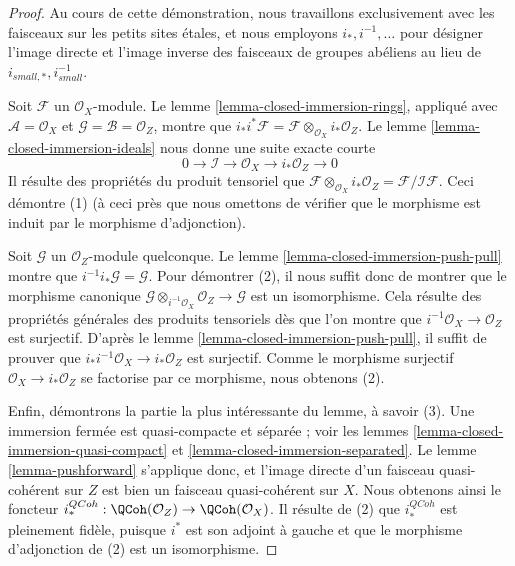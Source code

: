 \begin{proof}
Au cours de cette démonstration, nous travaillons exclusivement avec les faisceaux sur
les petits sites étales, et nous employons $i_*, i^{-1}, \ldots$
pour désigner l'image directe et l'image inverse des faisceaux de groupes abéliens
au lieu de $i_{small, *}, i_{small}^{-1}$.

\medskip\noindent
Soit $\mathcal{F}$ un $\mathcal{O}_X$-module. Le
lemme \ref{lemma-closed-immersion-rings}, appliqué avec
$\mathcal{A} = \mathcal{O}_X$ et
$\mathcal{G} = \mathcal{B} = \mathcal{O}_Z$, montre que
$i_*i^*\mathcal{F} = \mathcal{F} \otimes_{\mathcal{O}_X} i_*\mathcal{O}_Z$.
Le
lemme \ref{lemma-closed-immersion-ideals}
nous donne une suite exacte courte
$$
0 \to \mathcal{I} \to \mathcal{O}_X \to i_*\mathcal{O}_Z \to 0
$$
Il résulte des propriétés du produit tensoriel que
$\mathcal{F} \otimes_{\mathcal{O}_X} i_*\mathcal{O}_Z
= \mathcal{F}/\mathcal{I}\mathcal{F}$. Ceci démontre (1) (à ceci près
que nous omettons de vérifier que le morphisme est induit par le
morphisme d'adjonction).

\medskip\noindent
Soit $\mathcal{G}$ un $\mathcal{O}_Z$-module quelconque. Le
lemme \ref{lemma-closed-immersion-push-pull}
montre que $i^{-1}i_*\mathcal{G} = \mathcal{G}$.
Pour démontrer (2), il nous suffit donc de montrer que le morphisme canonique
$\mathcal{G} \otimes_{i^{-1}\mathcal{O}_X} \mathcal{O}_Z \to \mathcal{G}$
est un isomorphisme. Cela résulte des propriétés générales des produits tensoriels
dès que l'on montre que $i^{-1}\mathcal{O}_X \to \mathcal{O}_Z$ est surjectif. D'après le
lemme \ref{lemma-closed-immersion-push-pull},
il suffit de prouver que
$i_*i^{-1}\mathcal{O}_X \to i_*\mathcal{O}_Z$
est surjectif. Comme le morphisme surjectif $\mathcal{O}_X \to i_*\mathcal{O}_Z$
se factorise par ce morphisme, nous obtenons (2).

\medskip\noindent
Enfin, démontrons la partie la plus intéressante du lemme, à savoir (3).
Une immersion fermée est quasi-compacte et séparée ; voir les
lemmes \ref{lemma-closed-immersion-quasi-compact} et
\ref{lemma-closed-immersion-separated}. Le
lemme \ref{lemma-pushforward}
s'applique donc, et l'image directe d'un faisceau quasi-cohérent
sur $Z$ est bien un faisceau quasi-cohérent sur $X$.
Nous obtenons ainsi le foncteur
$i^{QCoh}_* : \QCoh(\mathcal{O}_Z)
\to \QCoh(\mathcal{O}_X)$.
Il résulte de (2) que $i^{QCoh}_*$ est pleinement fidèle, puisque
$i^*$ est son adjoint à gauche et que le morphisme d'adjonction de (2) est un isomorphisme.


\end{proof}
